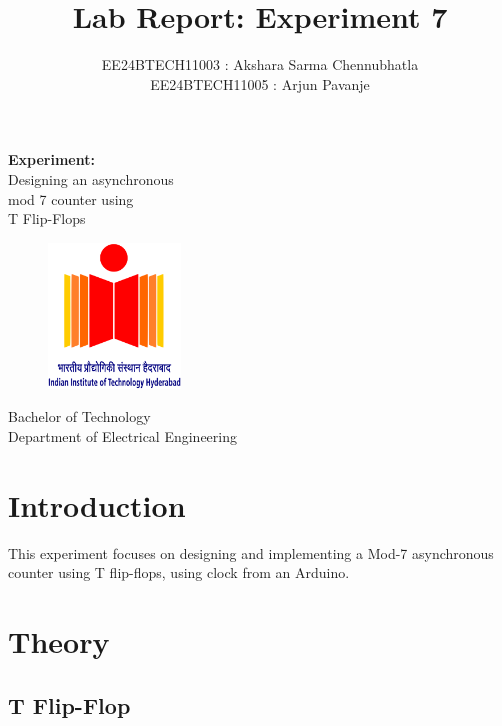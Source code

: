 \documentclass{article}
\title{\textbf{Lab Report: Experiment 7}}
\author{EE24BTECH11003 : Akshara Sarma Chennubhatla\\EE24BTECH11005 : Arjun Pavanje}
\begin{document}
\maketitle
\begin{center}
	\textbf{Experiment:}\\Designing an asynchronous\\mod 7 counter using\\T Flip-Flops 
\end{center}
\vspace{30pt}
\begin{figure}[h!]
	\centering
	\includegraphics[width = 100pt]{.logo/logo.png}\\
\end{figure}
\begin{center}
	Bachelor of Technology\\
	\vspace{10pt}
	Department of Electrical Engineering\\
\end{center}
\newpage


\section{Introduction}

This experiment focuses on designing and implementing a Mod-7 asynchronous counter using T flip-flops, using clock from an Arduino.

\section{Theory}
\subsection{T Flip-Flop}

\begin{figure}[!ht]
\centering
{}%

\label{fig:my_label}
\end{figure}
\end{document}
